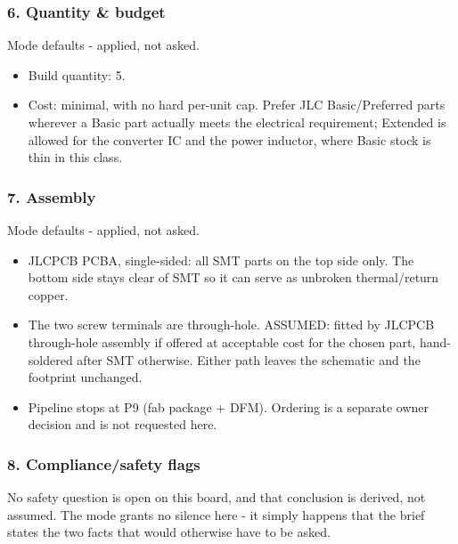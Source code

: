 \documentclass[11pt,a4paper]{article}
\begin{document}
\subsubsection*{6. Quantity \& budget}
Mode defaults - applied, not asked.

\begin{itemize}
\item Build quantity: 5.
\item Cost: minimal, with no hard per-unit cap. Prefer JLC Basic/Preferred
parts wherever a Basic part actually meets the electrical requirement;
Extended is allowed for the converter IC and the power inductor, where
Basic stock is thin in this class.
\end{itemize}
\subsubsection*{7. Assembly}
Mode defaults - applied, not asked.

\begin{itemize}
\item JLCPCB PCBA, single-sided: all SMT parts on the top side only. The
bottom side stays clear of SMT so it can serve as unbroken
thermal/return copper.
\item The two screw terminals are through-hole. ASSUMED: fitted by JLCPCB
through-hole assembly if offered at acceptable cost for the chosen
part, hand-soldered after SMT otherwise. Either path leaves the
schematic and the footprint unchanged.
\item Pipeline stops at P9 (fab package + DFM). Ordering is a separate owner
decision and is not requested here.
\end{itemize}
\subsubsection*{8. Compliance/safety flags}
No safety question is open on this board, and that conclusion is derived, not assumed. The mode grants no silence here - it simply happens that the brief states the two facts that would otherwise have to be asked.
\end{document}
